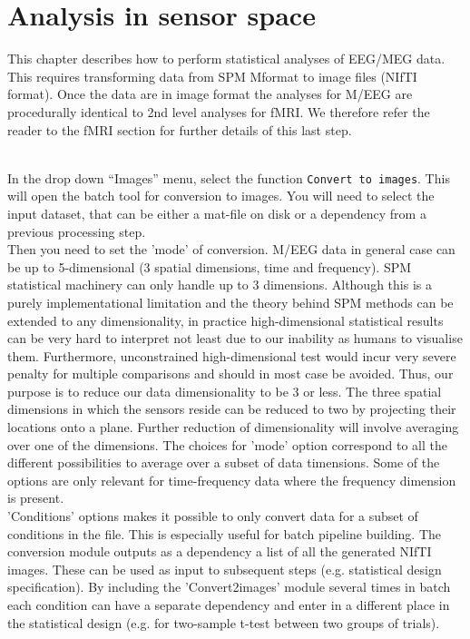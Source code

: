 \chapter{Analysis in sensor space \label{Chap:eeg:sensoranalysis}}

This chapter describes how to perform statistical analyses of EEG/MEG data. This requires transforming data from SPM M\EEG format to image files (NIfTI format). Once the data are in image format the analyses for M/EEG are procedurally identical to 2nd level analyses for fMRI.  We therefore refer the reader to the fMRI section for further details of this last step. 

\\
In the drop down ``Images'' menu, select the function \texttt{Convert to images}. This will open the batch tool for conversion to images. You will need to select the input dataset, that can be either a mat-file on disk or a dependency from a previous processing step.
\\
Then you need to set the 'mode' of conversion. M/EEG data in general case can be up to 5-dimensional (3 spatial dimensions, time and frequency). SPM statistical machinery can only handle up to 3 dimensions. Although this is a purely implementational limitation and the theory behind SPM methods can be extended to any dimensionality, in practice high-dimensional statistical results can be very hard to interpret not least due to our inability as humans to visualise them. Furthermore, unconstrained high-dimensional test would incur very severe penalty for multiple comparisons and should in most case be avoided. Thus, our purpose is to reduce our data dimensionality to be 3 or less. The three spatial dimensions in which the sensors reside can be reduced to two by projecting their locations onto a plane. Further reduction of dimensionality will involve averaging over one of the dimensions. The choices for 'mode' option correspond to all the different possibilities to average over a subset of data timensions. Some of the options are only relevant for time-frequency data where the frequency dimension is present.
\\
'Conditions' options makes it possible to only convert data for a subset of conditions in the file. This is especially useful for batch pipeline building. The conversion module outputs as a dependency a list of all the generated NIfTI images. These can be used as input to subsequent steps (e.g. statistical design specification). By including the 'Convert2images' module several times in batch each condition can have a separate dependency and enter in a different place in the statistical design (e.g. for two-sample t-test between two groups of trials). 
